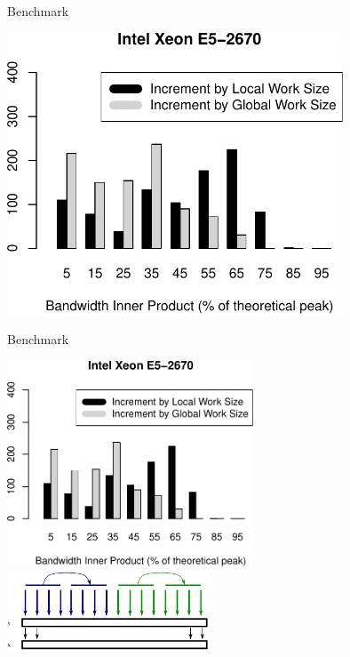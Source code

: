 \begin{frame}{Benchmark}
  \begin{center} \includegraphics[width=0.75\textwidth]{figures/xeon_cpu_double_hist_itertype_dot} \end{center}
\end{frame}

\begin{frame}{Benchmark}
  \begin{center} \includegraphics[width=0.55\textwidth]{figures/xeon_cpu_double_hist_itertype_dot} \\[1em]
                 \includegraphics[width=0.45\textwidth]{figures/copy-kernel-cpu-full} 
  \end{center}
\end{frame}


